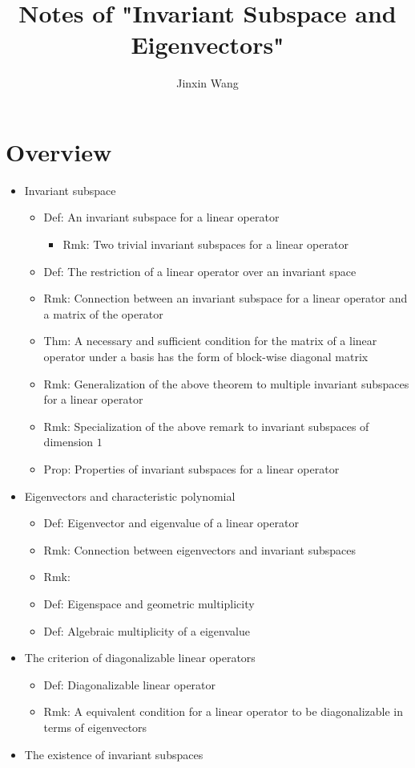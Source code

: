 \documentclass[onecolumn]{ctexart}
\title{Notes of "Invariant Subspace and Eigenvectors"}
\author{Jinxin Wang}
\date{}
\begin{document}
\maketitle

\section{Overview}
\begin{itemize}
  \item Invariant subspace
  \begin{itemize}
    \item Def: An invariant subspace for a linear operator
    \begin{itemize}
      \item Rmk: Two trivial invariant subspaces for a linear operator
    \end{itemize}
    \item Def: The restriction of a linear operator over an invariant space
    \item Rmk: Connection between an invariant subspace for a linear operator and a matrix of the operator
    \item Thm: A necessary and sufficient condition for the matrix of a linear operator under a basis has the form of block-wise diagonal matrix
    \item Rmk: Generalization of the above theorem to multiple invariant subspaces for a linear operator
    \item Rmk: Specialization of the above remark to invariant subspaces of dimension $1$
    \item Prop: Properties of invariant subspaces for a linear operator
  \end{itemize}
  \item Eigenvectors and characteristic polynomial
  \begin{itemize}
    \item Def: Eigenvector and eigenvalue of a linear operator
    \item Rmk: Connection between eigenvectors and invariant subspaces
    \item Rmk: 
    \item Def: Eigenspace and geometric multiplicity
    \item Def: Algebraic multiplicity of a eigenvalue
  \end{itemize}
  \item The criterion of diagonalizable linear operators
  \begin{itemize}
    \item Def: Diagonalizable linear operator
    \item Rmk: A equivalent condition for a linear operator to be diagonalizable in terms of eigenvectors
  \end{itemize}
  \item The existence of invariant subspaces
\end{itemize}
\end{document}
